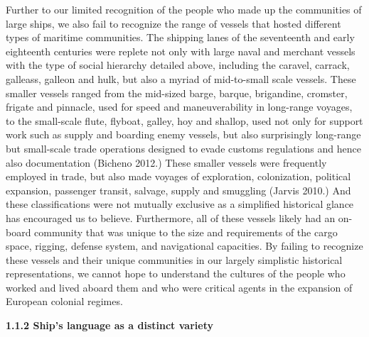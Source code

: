 \begin{styleNormali}
Further to our limited recognition of the people who made up the communities of large ships, we also fail to recognize the range of vessels that hosted different types of maritime communities. The shipping lanes of the seventeenth and early eighteenth centuries were replete not only with large naval and merchant vessels with the type of social hierarchy detailed above, including the caravel, carrack, galleass, galleon and hulk, but also a myriad of mid-to-small scale vessels. These smaller vessels ranged from the mid-sized barge, barque, brigandine, cromster, frigate and pinnacle, used for speed and maneuverability in long-range voyages, to the small-scale flute, flyboat, galley, hoy and shallop, used not only for support work such as supply and boarding enemy vessels, but also surprisingly long-range but small-scale trade operations designed to evade customs regulations and hence also documentation (Bicheno 2012.) These smaller vessels were frequently employed in trade, but also made voyages of exploration, colonization, political expansion, passenger transit, salvage, supply and smuggling (Jarvis 2010.) And these classifications were not mutually exclusive as a simplified historical glance has encouraged us to believe. Furthermore, all of these vessels likely had an on-board community that was unique to the size and requirements of the cargo space, rigging, defense system, and navigational capacities. By failing to recognize these vessels and their unique communities in our largely simplistic historical representations, we cannot hope to understand the cultures of the people who worked and lived aboard them and who were critical agents in the expansion of European colonial regimes. 
\end{styleNormali}


\begin{styleNormali}
\textbf{1.1.2 Ship’s language as a distinct variety}
\end{styleNormali}


